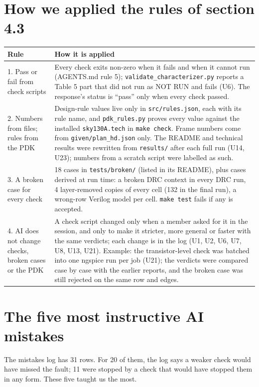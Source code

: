 \documentclass[10pt,a4paper]{article}
\newcommand{\code}[1]{\texttt{#1}}
\begin{document}
\section{How we applied the rules of section 4.3}
{\small
\begin{longtable}{@{}L{42mm}L{123mm}@{}}
\toprule
\textbf{Rule} & \textbf{How it is applied}\\
\midrule{}. Pass or fail from check scripts & Every check exits non-zero when it fails and when it cannot run (AGENTS.md rule 5); \code{validate\_characterizer.py} reports a Table 5 part that did not run as NOT RUN and fails (U6). The response's status is ``pass'' only when every check passed.\\
2. Numbers from files; rules from the PDK & Design-rule values live only in \code{src/rules.json}, each with its rule name, and \code{pdk\_rules.py} proves every value against the installed \code{sky130A.tech} in \code{make check}. Frame numbers come from \code{given/plan\_hd.json} only. The README and technical results were rewritten from \code{results/} after each full run (U14, U23); numbers from a scratch script were labelled as such.\\
3. A broken case for every check & 18 cases in \code{tests/broken/} (listed in its README), plus cases derived at run time: a broken DRC context in every DRC run, 4 layer-removed copies of every cell (132 in the final run), a wrong-row Verilog model per cell. \code{make test} fails if any is accepted.\\
4. AI does not change checks, broken cases or the PDK & A check script changed only when a member asked for it in the session, and only to make it stricter, more general or faster with the same verdicts; each change is in the log (U1, U2, U6, U7, U8, U13, U21). Example: the transistor-level check was batched into one ngspice run per job (U21); the verdicts were compared case by case with the earlier reports, and the broken case was still rejected on the same row and edges.\\
\bottomrule
\end{longtable}}

\section{The five most instructive AI mistakes}
The mistakes log has 31 rows. For 20 of them, the log says a weaker check would have missed the fault; 11 were stopped by a check that would have stopped them in any form. These five taught us the most.
\end{document}

